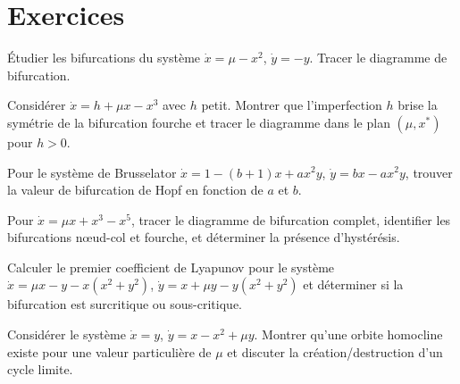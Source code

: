 \section{Exercices}

\begin{exercice}
\'Etudier les bifurcations du syst\`eme
$\dot{x} = \mu - x^2$, $\dot{y} = -y$. Tracer le diagramme de bifurcation.
\end{exercice}

\begin{exercice}
Consid\'erer $\dot{x} = h + \mu x - x^3$ avec $h$ petit. Montrer que
l'imperfection $h$ brise la sym\'etrie de la bifurcation fourche et
tracer le diagramme dans le plan $(\mu, x^*)$ pour $h > 0$.
\end{exercice}

\begin{exercice}
Pour le syst\`eme de Brusselator $\dot{x} = 1 - (b+1)x + ax^2y$,
$\dot{y} = bx - ax^2y$, trouver la valeur de bifurcation de Hopf
en fonction de $a$ et $b$.
\end{exercice}

\begin{exercice}
Pour $\dot{x} = \mu x + x^3 - x^5$, tracer le diagramme de bifurcation
complet, identifier les bifurcations n\oe ud-col et fourche, et
d\'eterminer la pr\'esence d'hyst\'er\'esis.
\end{exercice}

\begin{exercice}
Calculer le premier coefficient de Lyapunov pour le syst\`eme
$\dot{x} = \mu x - y - x(x^2 + y^2)$,
$\dot{y} = x + \mu y - y(x^2 + y^2)$
et d\'eterminer si la bifurcation est surcritique ou sous-critique.
\end{exercice}

\begin{exercice}
Consid\'erer le syst\`eme $\dot{x} = y$, $\dot{y} = x - x^2 + \mu y$.
Montrer qu'une orbite homocline existe pour une valeur particuli\`ere de $\mu$
et discuter la cr\'eation/destruction d'un cycle limite.
\end{exercice}
